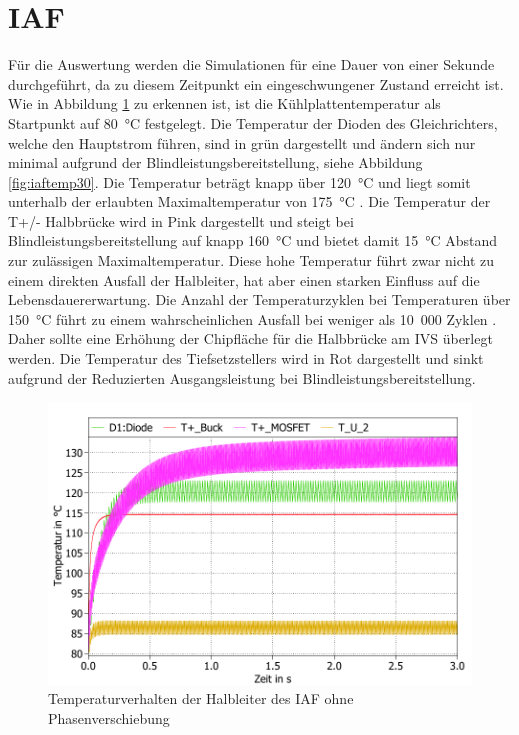 \section{IAF}
Für die Auswertung werden die Simulationen für eine Dauer von einer Sekunde durchgeführt, da zu diesem Zeitpunkt ein eingeschwungener Zustand erreicht ist. Wie in Abbildung \ref{fig:iaftemp0} zu erkennen ist, ist die Kühlplattentemperatur als Startpunkt auf 80~°C festgelegt. Die Temperatur der Dioden des Gleichrichters, welche den Hauptstrom führen, sind in grün dargestellt und ändern sich nur minimal aufgrund der Blindleistungsbereitstellung, siehe Abbildung \ref{fig:iaftemp30}. Die Temperatur beträgt knapp über 120~°C und liegt somit unterhalb der erlaubten Maximaltemperatur von 175~°C \cite{IFAGFF2}. Die Temperatur der T+/- Halbbrücke wird in Pink dargestellt und steigt bei Blindleistungsbereitstellung auf knapp 160~°C und bietet damit 15~°C Abstand zur zulässigen Maximaltemperatur.  Diese hohe Temperatur führt zwar nicht zu einem direkten Ausfall der Halbleiter, hat aber einen starken Einfluss auf die Lebensdauererwartung. Die Anzahl der Temperaturzyklen bei Temperaturen über 150~°C führt zu einem wahrscheinlichen Ausfall bei weniger als 10~000 Zyklen \cite{SicTemp}. Daher sollte eine Erhöhung der Chipfläche für die Halbbrücke am \gls{IVS} überlegt werden. Die Temperatur des Tiefsetzstellers wird in Rot dargestellt und sinkt aufgrund der Reduzierten Ausgangsleistung bei Blindleistungsbereitstellung.  
\begin{figure} 
	\centering
	\includegraphics[width=0.9\linewidth]{content/Grafiken/IAF_Temp_0Grad}


	\caption{Temperaturverhalten der Halbleiter des IAF ohne Phasenverschiebung}
	\label{fig:iaftemp0}
\end{figure}

